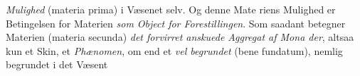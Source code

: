 \documentclass[12pt,a4paper]{book}
\begin{document}
\emph{Mulighed} (materia prima) i Væsenet selv. Og denne Mate\-%
riens Mulighed er Betingelsen for Materien \emph{som Object for
Forestillingen}. Som saadant betegner Materien (materia
secunda) \emph{det forvirret anskuede Aggregat af Mona\-%
der}, altsaa kun et Skin, et \emph{Phænomen}, om end et \emph{vel
begrundet} (bene fundatum), nemlig begrundet i det Væsent\-%
\end{document}
